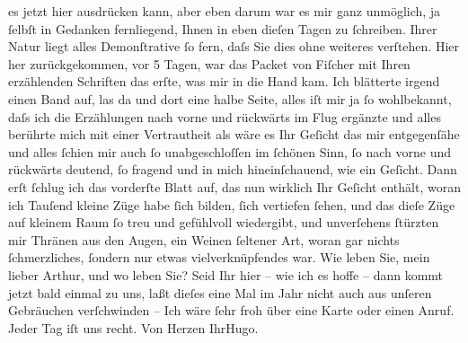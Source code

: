 \begin{ledgroupsized}[t]{13cm}
               es jetzt hier ausdrücken kann, aber eben darum war es mir ganz {\pb}unmöglich, ja ſelbſt in Gedanken fernliegend, Ihnen in
               eben dieſen Tagen zu ſchreiben. Ihrer Natur liegt alles Demonſtrative ſo fern, daſs
               Sie dies ohne weiteres verſtehen.\pend
           \pstart
           Hier her zurückgekommen, vor 5 Tagen, war das Packet von Fiſcher mit Ihren erzählenden
                  Schriften das erſte, was mir in die Hand kam. Ich blätterte irgend einen Band
               auf, las da und dort eine halbe Seite, alles iſt mir ja ſo wohlbekannt, daſs ich die
               Erzählungen nach vorne und rückwärts im Flug ergänzte und alles berührte mich mit
               einer Vertrautheit als wäre es Ihr Geſicht das mir entgegenſähe und alles ſchien mir
               auch ſo unabgeschloſſen im ſchönen Sinn, ſo nach vorne und rückwärts deutend, ſo
               fragend und in mich hineinſchauend, wie ein Geſicht. Dann erſt ſchlug ich das
               vorderſte Blatt auf, das nun wirklich Ihr Geſicht enthält, woran ich Tauſend kleine Züge habe ſich
               bilden, ſich vertiefen ſehen, und das dieſe Züge auf kleinem Raum ſo treu und
               gefühlvoll wiedergibt, und unverſehens ſtürzten mir {\pb}Thränen aus den Augen, ein Weinen ſeltener Art, woran gar nichts ſchmerzliches,
               ſondern nur etwas vielverknüpfendes war.\pend
           \pstart
           Wie leben Sie, mein lieber Arthur, und wo leben Sie? Seid Ihr hier – wie ich es hoffe
               – dann kommt jetzt bald einmal zu uns, laßt dieſes eine Mal im Jahr nicht auch aus
               unſeren Gebräuchen verſchwinden – \pend
           \pstart
           Ich wäre ſehr froh über eine Karte oder einen Anruf. Jeder Tag iſt uns recht.\pend
           \pstart Von Herzen Ihr\spacefill\mbox{Hugo.}\pend{}\endnumbering{}\end{ledgroupsized}  \newcommand{\dateiname}{L02074}\newcommand{\titel}{Hugo von Hofmannsthal an Arthur Schnitzler, 12. 6. 1912}\newcommand{\editorInnen}{Martin Anton Müller und Gerd-Hermann Susen}
      